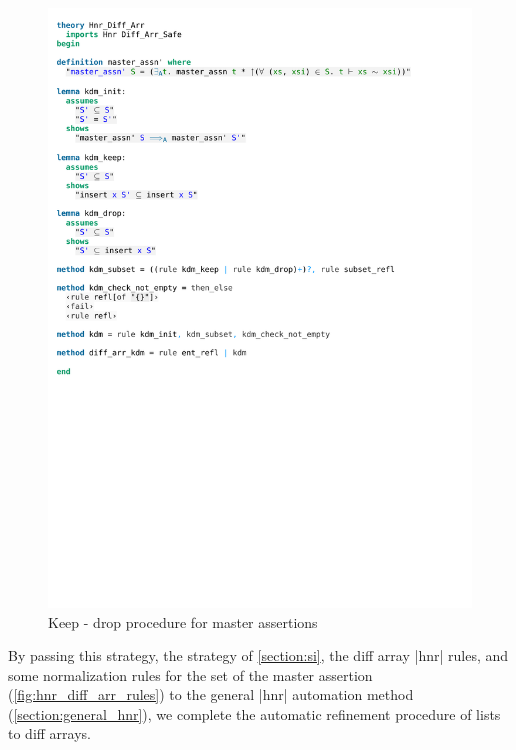 \begin{figure}[!htpb]
    \includegraphics[trim={0 12,4cm 0 16cm}, clip, width=1.00\textwidth]{figures/Theory_Hnr_Diff_Arr_KDM.pdf}
    \caption[Keep - drop procedure for master assertions]{Keep - drop procedure for master assertions}
    \label{fig:kdm_method}
\end{figure}

\noindent By passing this strategy, the strategy of \autoref{section:si}, the diff array |hnr| rules, and some normalization rules for the set of the master assertion (\autoref{fig:hnr_diff_arr_rules}) to the general |hnr| automation method (\autoref{section:general_hnr}), we complete the automatic refinement procedure of lists to diff arrays.

